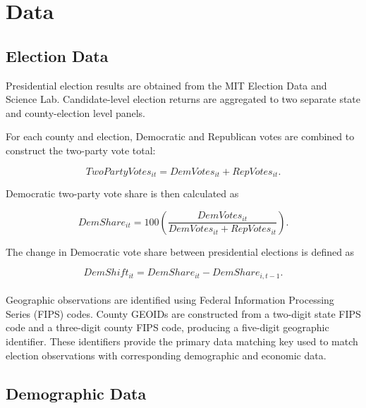 \documentclass[12pt]{article}
\begin{document}
	
	
	
	\section{Data}
	
	\subsection{Election Data}
	
	Presidential election results are obtained from the MIT Election Data
	and Science Lab. Candidate-level election returns are aggregated to
	two separate state and county-election level panels.
	
	For each county and election, Democratic and Republican votes are
	combined to construct the two-party vote total:
	
	\begin{equation}
		TwoPartyVotes_{it}
		=
		DemVotes_{it} + RepVotes_{it}.
	\end{equation}
	
	Democratic two-party vote share is then calculated as
	
	\begin{equation}
		DemShare_{it}
		=
		100
		\left(
		\frac{DemVotes_{it}}
		{DemVotes_{it}+RepVotes_{it}}
		\right).
	\end{equation}
	
	The change in Democratic vote share between presidential elections is
	defined as
	
	\begin{equation}
		DemShift_{it}
		=
		DemShare_{it} - DemShare_{i,t-1}.
	\end{equation}\\
	
	Geographic observations are identified using Federal Information
	Processing Series (FIPS) codes. County GEOIDs are constructed from a
	two-digit state FIPS code and a three-digit county FIPS code, producing
	a five-digit geographic identifier. These identifiers provide the
	primary data matching key used to match election observations with
	corresponding demographic and economic data.
	
	\subsection{Demographic Data}
	
\end{document}
